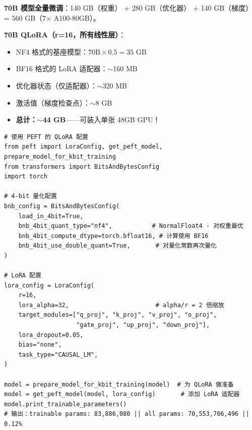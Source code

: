 \begin{examplebox}
\textbf{70B 模型全量微调}：140 GB（权重） + 280 GB（优化器） + 140 GB（梯度） = 560 GB（7$\times$ A100-80GB）。

\textbf{70B QLoRA（r=16，所有线性层）}：

\begin{itemize}
  \item NF4 格式的基座模型：$70\text{B} \times 0.5 = 35$ GB
  \item BF16 格式的 LoRA 适配器：$\sim$160 MB
  \item 优化器状态（仅适配器）：$\sim$320 MB
  \item 激活值（梯度检查点）：$\sim$8 GB
  \item \textbf{总计：$\sim$44 GB}——可装入单张 48GB GPU！
\end{itemize}
\end{examplebox}

\begin{lstlisting}[style=pythonstyle]
# 使用 PEFT 的 QLoRA 配置
from peft import LoraConfig, get_peft_model, prepare_model_for_kbit_training
from transformers import BitsAndBytesConfig
import torch

# 4-bit 量化配置
bnb_config = BitsAndBytesConfig(
    load_in_4bit=True,
    bnb_4bit_quant_type="nf4",           # NormalFloat4 - 对权重最优
    bnb_4bit_compute_dtype=torch.bfloat16, # 计算使用 BF16
    bnb_4bit_use_double_quant=True,       # 对量化常数再次量化
)

# LoRA 配置
lora_config = LoraConfig(
    r=16,
    lora_alpha=32,                        # alpha/r = 2 倍缩放
    target_modules=["q_proj", "k_proj", "v_proj", "o_proj",
                    "gate_proj", "up_proj", "down_proj"],
    lora_dropout=0.05,
    bias="none",
    task_type="CAUSAL_LM",
)

model = prepare_model_for_kbit_training(model)  # 为 QLoRA 做准备
model = get_peft_model(model, lora_config)       # 添加 LoRA 适配器
model.print_trainable_parameters()
# 输出：trainable params: 83,886,080 || all params: 70,553,706,496 || 0.12%
\end{lstlisting}

